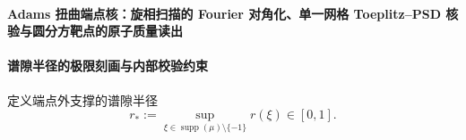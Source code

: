 \paragraph{Adams 扭曲端点核：旋相扫描的 Fourier 对角化、单一网格 Toeplitz--PSD 核验与圆分方靶点的原子质量读出}
\iffalse
对任意整数 \(d\ge 1\)，定义 \(d\)-扭曲矩
\[
c^{(d)}_h:=c_{dh}\qquad(h\in\ZZ),
\]
并令
\(
\mathbf{T}^{(d)}_N:=(c^{(d)}_{j-k})_{0\le j,k\le N}
\)。
以同一二项式向量 \(b^{(N)}\) 定义扭曲端点热核探针
\[
a_N^{(d)}:=4^{-N}\,(b^{(N)})^\ast\,\mathbf{T}^{(d)}_N\,b^{(N)}.
\]
则对所有 \(N\ge 0\) 成立严格恒等式
\[
\boxed{\;
a_N^{(d)}=\int_{\TT}\left(\frac{|1-\xi^d|^2}{4}\right)^{N}\,\dd\mu(\xi)\ \ge\ 0\;}
\]
并且 \((a_N^{(d)})_{N\ge 0}\) 单调下降且满足
\[
\boxed{\;
a_N^{(d)}\ \downarrow\ \mu\bigl(\{\xi\in\TT:\ \xi^d=-1\}\bigr)\qquad(N\to\infty).\;}
\]
\end{theorem}
\begin{proof}
由
\(
(1-\xi^d)^N=\sum_{k=0}^{N}(-1)^k\binom{N}{k}\xi^{dk}
\)
展开并按命题 \ref{prop:xi-endpoint-heat-probe-toeplitz-herglotz-identity} 的同一计算，得到
\[
4^{-N}(b^{(N)})^\ast\mathbf{T}^{(d)}_N b^{(N)}
=\frac{1}{4^N}\int_{\TT}|1-\xi^d|^{2N}\,\dd\mu(\xi)
=\int_{\TT}\left(\frac{|1-\xi^d|^2}{4}\right)^{N}\,\dd\mu(\xi).
\]
对任意 \(\xi\in\TT\) 有 \(|1-\xi^d|\le 2\)，且 \(|1-\xi^d|=2\) 当且仅当 \(\xi^d=-1\)。
因此核函数 \(\left(|1-\xi^d|^2/4\right)^{N}\) 随 \(N\) 单调下降到指示函数 \(\ind_{\{\xi^d=-1\}}\)。
由单调收敛定理得到极限等于 \(\mu(\{\xi^d=-1\})\)。证毕。
\end{proof}

\begin{corollary}[半角纤维的可核验质量]\label{cor:xi-endpoint-heat-probe-adams-twist-halfangle}
在定理 \ref{thm:xi-endpoint-heat-probe-adams-twist-roots} 中取 \(d=2\)，则
\[
a_N^{(2)}\ \downarrow\ \mu(\{i\})+\mu(\{-i\})\qquad(N\to\infty).
\]
\leanverified{paper\_xi\_endpoint\_heat\_probe\_adams\_twist\_halfangle}
\end{corollary}
\begin{proof}
由 \(\xi^2=-1\iff \xi\in\{\pm i\}\) 直接代入得到。证毕。
\end{proof}
\fi
\paragraph{谱隙半径的极限刻画与内部校验约束}
定义端点外支撑的谱隙半径
\begin{equation}\label{eq:xi-endpoint-heat-probe-rstar-def}
\boxed{\;
r_\ast:=\sup_{\xi\in\operatorname{supp}(\mu)\setminus\{-1\}}r(\xi)\in[0,1].\;}
\end{equation}

